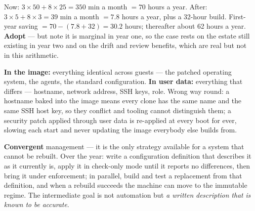 \begin{ans}
  \item Now: $3 \times 50 + 8 \times 25 = 350$ min a month $= 70$ hours a year.
        After: $3 \times 5 + 8 \times 3 = 39$ min a month $= 7.8$ hours a year,
        plus a 32-hour build. First-year saving
        $= 70 - (7.8 + 32) = \mathbf{30.2}$ hours; thereafter about 62 hours a
        year. \textbf{Adopt} --- but note it is marginal in year one, so the
        case rests on the estate still existing in year two and on the drift and
        review benefits, which are real but not in this arithmetic.
  \item \textbf{In the image:} everything identical across guests --- the
        patched operating system, the agents, the standard configuration.
        \textbf{In user data:} everything that differs --- hostname, network
        address, SSH keys, role. Wrong way round: a hostname baked into the
        image means every clone has the same name and the same SSH host key, so
        they conflict and tooling cannot distinguish them; a security patch
        applied through user data is re-applied at every boot for ever, slowing
        each start and never updating the image everybody else builds from.
  \item \textbf{Convergent} management --- it is the only strategy available for
        a system that cannot be rebuilt. Over the year: write a configuration
        definition that describes it as it currently is, apply it in check-only
        mode until it reports no differences, then bring it under enforcement;
        in parallel, build and test a replacement from that definition, and when
        a rebuild succeeds the machine can move to the immutable regime. The
        intermediate goal is not automation but \emph{a written description that
        is known to be accurate}.
\end{ans}


